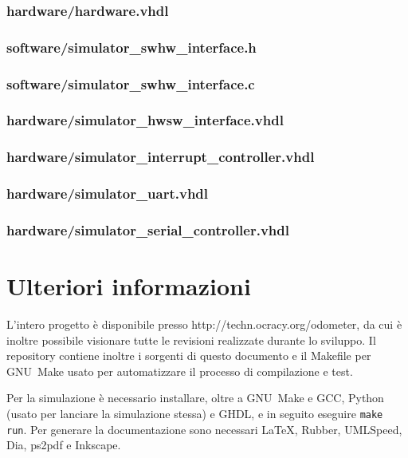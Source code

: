 \documentclass [11pt,a4paper,oneside]{paper}
\newcommand{\href}[2]{#2}
\newcommand{\link}[1]{\href{#1}{#1}}
\newcommand{\inputVHDL}[1]{}
\newcommand{\inputC}[1]{}
\begin{document}
\subsubsection{hardware/hardware.vhdl}
\inputVHDL{hardware/hardware.vhdl}

\subsubsection{software/simulator\_swhw\_interface.h}
\inputC{software/simulator_swhw_interface.h}

\subsubsection{software/simulator\_swhw\_interface.c}
\inputC{software/simulator_swhw_interface.c}

\subsubsection{hardware/simulator\_hwsw\_interface.vhdl}
\inputVHDL{hardware/simulator_hwsw_interface.vhdl}

\subsubsection{hardware/simulator\_interrupt\_controller.vhdl}
\inputVHDL{hardware/simulator_interrupt_controller.vhdl}

\subsubsection{hardware/simulator\_uart.vhdl}
\inputVHDL{hardware/simulator_uart.vhdl}

\subsubsection{hardware/simulator\_serial\_controller.vhdl}
\inputVHDL{hardware/simulator_serial_controller.vhdl}


\section{Ulteriori informazioni}
L'intero progetto è disponibile presso \link{http://techn.ocracy.org/odometer}, da cui
è inoltre possibile visionare tutte le revisioni realizzate durante lo sviluppo.
Il repository contiene inoltre i sorgenti di questo documento e il Makefile
per GNU~Make usato per automatizzare il processo di compilazione e test.

Per la simulazione è necessario installare, oltre a GNU~Make e GCC, Python
(usato per lanciare la simulazione stessa) e GHDL, e in seguito eseguire
\texttt{make run}. Per generare la documentazione sono necessari \LaTeX,
Rubber, UMLSpeed, Dia, ps2pdf e Inkscape.
\end{document}
